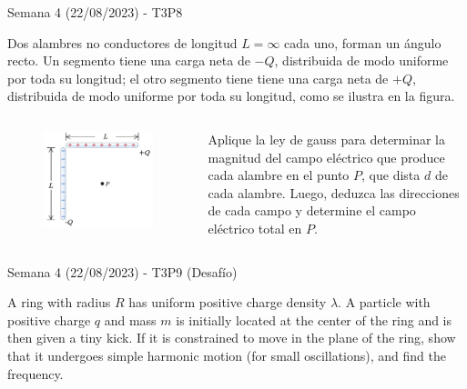 \begin{frame}{Semana 4 (22/08/2023) - T3P8}
  
  Dos alambres no conductores de longitud $L=\infty$ cada uno, forman un ángulo recto. Un segmento tiene una carga neta de $-Q$, distribuida de modo uniforme por toda su longitud; el otro segmento tiene tiene una carga neta de $+Q$, distribuida de modo uniforme por toda su longitud, como se ilustra en la figura.
    
    \begin{columns}
    
    
    \begin{figure}
        \centering
        \includegraphics[scale=0.25]{figures/q2.png}
    \end{figure}
    
    
    Aplique la ley de gauss para determinar la magnitud del campo el\'ectrico que produce cada alambre en el punto $P$, que dista $d$ de cada alambre. Luego, deduzca las direcciones de cada campo y determine el campo el\'ectrico total en $P$.
    
    \end{columns}
    
\end{frame}

\begin{frame}{Semana 4 (22/08/2023) - T3P9 (Desafío)}
  
  A ring with radius $R$ has uniform positive charge density $\lambda$. A particle with positive charge $q$ and mass $m$ is initially located at the center of the ring and is then given a tiny kick. If it is constrained to move in the plane of the ring, show that it undergoes simple harmonic motion (for small oscillations), and find the frequency.
    
\end{frame}

